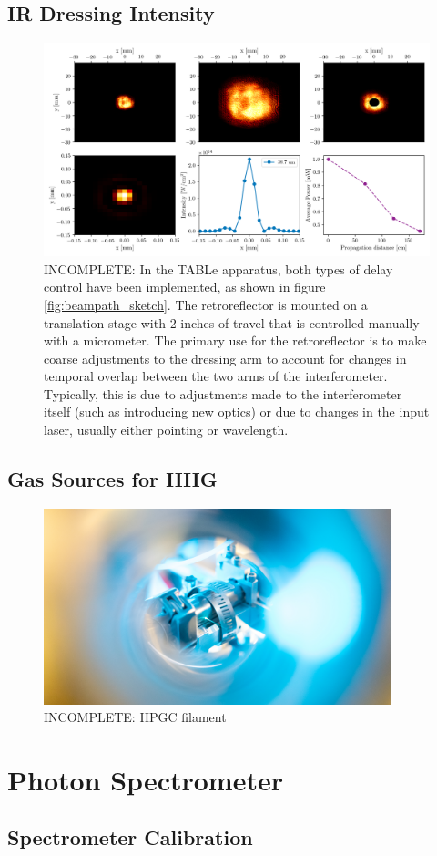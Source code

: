 \subsection{IR Dressing Intensity}
\label{sec:dressing_intensity}

\begin{figure}
	\includegraphics[width=\textwidth]{figures/Beamline/pump_intensity.png}
	\caption{INCOMPLETE: In the TABLe apparatus, both types of delay control have been implemented, as shown in figure \ref{fig:beampath_sketch}.  The retroreflector is mounted on a translation stage with 2 inches of travel that is controlled manually with a micrometer.  The primary use for the retroreflector is to make coarse adjustments to the dressing arm to account for changes in temporal overlap between the two arms of the interferometer.  Typically, this is due to adjustments made to the interferometer itself (such as introducing new optics) or due to changes in the input laser, usually either pointing or wavelength.  }
	\label{fig:dressing_intensity}
\end{figure}

\subsection{Gas Sources for HHG}
\label{sec:gas_source}
\begin{figure}
	\centering
	\includegraphics[width=0.9\textwidth]{figures/Beamline/high_pressure_cell_filament.jpg}
	\caption{INCOMPLETE: HPGC filament}
	\label{fig:HPGC_filament}
\end{figure}

\section{Photon Spectrometer}
\label{sec:photon_spec}


\subsection{Spectrometer Calibration}
\label{subsec:spec_calibration}